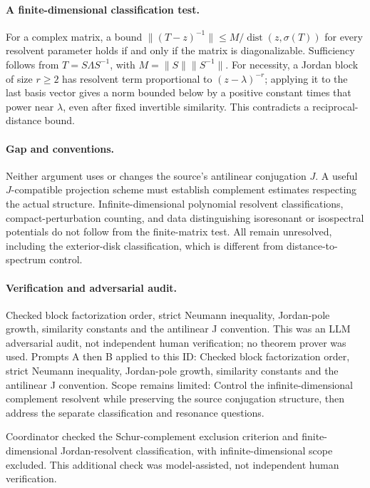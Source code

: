 \documentclass[11pt]{article}
\begin{document}
\paragraph{A finite-dimensional classification test.}For a complex matrix, a bound \(\|(T-z)^{-1}\|\le M/\operatorname{dist}(z,\sigma(T))\) for every resolvent parameter holds if and only if the matrix is diagonalizable. Sufficiency follows from \(T=S\Lambda S^{-1}\), with \(M=\|S\|\|S^{-1}\|\). For necessity, a Jordan block of size \(r\ge2\) has resolvent term proportional to \((z-\lambda)^{-r}\); applying it to the last basis vector gives a norm bounded below by a positive constant times that power near \(\lambda\), even after fixed invertible similarity. This contradicts a reciprocal-distance bound.
\paragraph{Gap and conventions.}Neither argument uses or changes the source's antilinear conjugation \(J\). A useful \(J\)-compatible projection scheme must establish complement estimates respecting the actual structure. Infinite-dimensional polynomial resolvent classifications, compact-perturbation counting, and data distinguishing isoresonant or isospectral potentials do not follow from the finite-matrix test. All remain unresolved, including the exterior-disk classification, which is different from distance-to-spectrum control.

\paragraph{Verification and adversarial audit.}
Checked block factorization order, strict Neumann inequality, Jordan-pole growth, similarity constants and the antilinear J convention. This was an LLM adversarial audit, not independent human verification; no theorem prover was used. Prompts A then B applied to this ID: Checked block factorization order, strict Neumann inequality, Jordan-pole growth, similarity constants and the antilinear J convention. Scope remains limited: Control the infinite-dimensional complement resolvent while preserving the source conjugation structure, then address the separate classification and resonance questions.

Coordinator checked the Schur-complement exclusion criterion and finite-dimensional Jordan-resolvent classification, with infinite-dimensional scope excluded. This additional check was model-assisted, not independent human verification.
\end{document}
